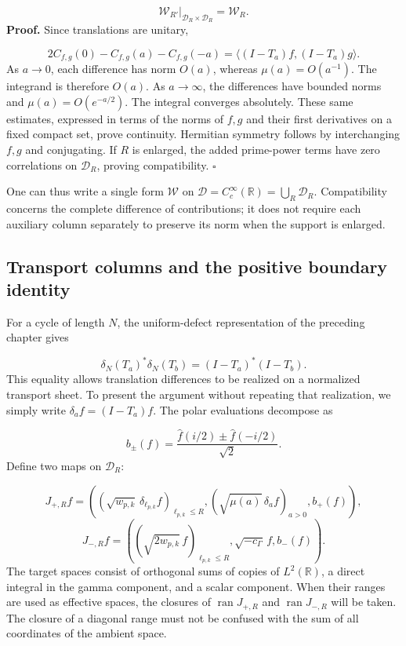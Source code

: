 \[
\mathscr W_{R'}|_{\mathcal D_R\times\mathcal D_R}=\mathscr W_R.
\]
\textbf{Proof.} Since translations are unitary,

\[
2C_{f,g}(0)-C_{f,g}(a)-C_{f,g}(-a)
=\langle(I-T_a)f,(I-T_a)g\rangle.
\]
As \(a\to0\), each difference has norm \(O(a)\), whereas \(\mu(a)=O(a^{-1})\). The integrand is therefore \(O(a)\). As \(a\to\infty\), the differences have bounded norms and \(\mu(a)=O(e^{-a/2})\). The integral converges absolutely. These same estimates, expressed in terms of the norms of \(f,g\) and their first derivatives on a fixed compact set, prove continuity. Hermitian symmetry follows by interchanging \(f,g\) and conjugating. If \(R\) is enlarged, the added prime-power terms have zero correlations on \(\mathcal D_R\), proving compatibility. \hfill\(\square\)

One can thus write a single form \(\mathscr W\) on \(\mathcal D=C_c^\infty(\mathbb R)=\bigcup_R\mathcal D_R\). Compatibility concerns the complete difference of contributions; it does not require each auxiliary column separately to preserve its norm when the support is enlarged.

\subsection{Transport columns and the positive boundary identity}
\label{viii:rz:columnas}
For a cycle of length \(N\), the uniform-defect representation of the preceding chapter gives

\[
\delta_N(T_a)^*\delta_N(T_b)=(I-T_a)^*(I-T_b).
\]
This equality allows translation differences to be realized on a normalized transport sheet. To present the argument without repeating that realization, we simply write \(\delta_af=(I-T_a)f\). The polar evaluations decompose as

\[
b_\pm(f)=\frac{\widehat f(i/2)\pm\widehat f(-i/2)}{\sqrt2}.
\]
Define two maps on \(\mathcal D_R\):

\[
J_{+,R}f=
\left(
(\sqrt{w_{p,k}}\,\delta_{\ell_{p,k}}f)_{\ell_{p,k}\leq R},
(\sqrt{\mu(a)}\,\delta_af)_{a>0},
b_+(f)
\right),
\]
\[
J_{-,R}f=
\left(
(\sqrt{2w_{p,k}}\,f)_{\ell_{p,k}\leq R},
\sqrt{-c_\Gamma}\,f,
b_-(f)
\right).
\]
The target spaces consist of orthogonal sums of copies of \(L^2(\mathbb R)\), a direct integral in the gamma component, and a scalar component. When their ranges are used as effective spaces, the closures of \(\operatorname{ran}J_{+,R}\) and \(\operatorname{ran}J_{-,R}\) will be taken. The closure of a diagonal range must not be confused with the sum of all coordinates of the ambient space.

